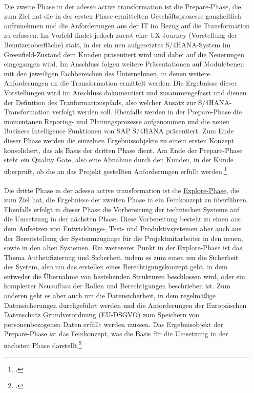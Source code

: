 \\Die zweite Phase in der adesso active transformation ist die \underline{\glqq{}Prepare\grqq{}-Phase}, die zum Ziel hat die in der ersten Phase ermittelten Geschäftsprozesse ganzheitlich aufzunehmen und die Anforderungen aus der IT im Bezug auf die Transformation zu erfassen. Im Vorfeld findet jedoch zuerst eine UX-Journey (Vorstellung der Benutzeroberfläche) statt, in der ein neu aufgesetztes S/4HANA-System im Greenfield-Zustand dem Kunden präsentiert wird und dabei auf die Neuerungen eingegangen wird. Im Anschluss folgen weitere Präsentationen auf Modulebenen mit den jeweiligen Fachbereichen des Unternehmen, in denen weitere Anforderungen an die Transformation ermittelt werden. Die Ergebnisse dieser Vorstellungen wird im Anschluss dokumentiert und zusammengefasst und dienen der Definition des Tranformationspfads, also welcher Ansatz zur S/4HANA-Transformation verfolgt werden soll. Ebenfalls werden in der Prepare-Phase die momentanen Reporing- und Planungsprozesse aufgenommen und die neuen Business Intelligence Funktionen von SAP S/4HANA präsentiert. Zum Ende dieser Phase werden die einzelnen Ergebnissobjekte zu einem ersten Konzept konsolidiert, das als Basis der dritten Phase dient. Am Ende der Prepare-Phase steht ein \glqq{}Quality Gate\grqq{}, also eine Abnahme durch den Kunden, in der Kunde überprüft, ob die an das Projekt gestellten Anforderungen erfüllt werden.\footcite[Vgl.][]{aat-prepare}\\
\vspace{1em}
\\Die dritte Phase in der adesso active transformation ist die \underline{\glqq{}Explore\grqq{}-Phase}, die zum Ziel hat, die Ergebnisse der zweiten Phase in ein Feinkonzept zu überführen. Ebenfalls erfolgt in dieser Phase die Vorbereitung der technischen Systeme auf die Umsetzung in der nächsten Phase. Diese Vorbereitung besteht zu einen aus dem Aufsetzen von Entwicklungs-, Test- und Produktivsystemen aber auch aus der Bereitstellung der Systenmzugänge für die Projektmitarbeiter in den neuen, sowie in den alten Systemen. Ein weitererer Punkt in der Explore-Phase ist das Thema Authetifizierung und Sicherheit, indem es zum einen um die Sicherheit des System, also um das erstellen eines Berechtigungskonzept geht, in dem entweder die Übernahme von bestehenden Strukturen beschlossen wird, oder ein kompletter Neuaufbau der Rollen und Berechtigungen beschrieben ist. Zum anderen geht es aber auch um die Datensicherheit, in dem regelmäßige Datensicherungen durchgeführt werden und die Anforderungen der Europäischen Datenschutz Grundverordnung (EU-DSGVO) zum Speichern von personenbezogenen Daten erfüllt werden müssen. Das Ergebnisobjekt der Prepare-Phase ist das Feinkonzept, was die Basis für die Umsetzung in der nächsten Phase darstellt.\footcite[Vgl.][]{aat-explore}\\
